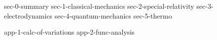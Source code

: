 \documentclass[11pt, letterpaper]{report}
\begin{document}
\begin{titlepage}
\maketitle
\setcounter{tocdepth}{1}
\tableofcontents
\end{titlepage}


{sec-0-summary}
{sec-1-classical-mechanics}
{sec-2-special-relativity}
{sec-3-electrodynamics}
{sec-4-quantum-mechanics}
{sec-5-thermo}


\begin{appendices}
{app-1-calc-of-variations}
{app-2-func-analysis}
\end{appendices}


\newpage




\newpage
\printindex


\end{document}
